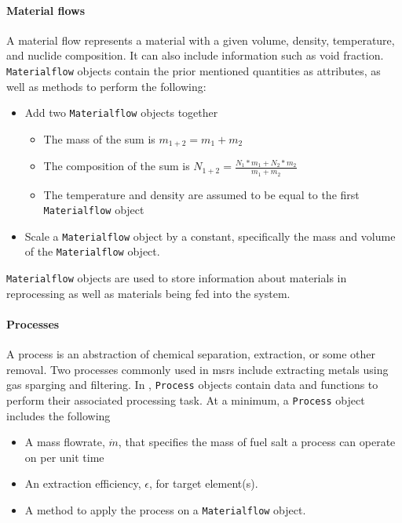 \paragraph{Material flows}
    A material flow represents a material with a given
    volume, density, temperature, and nuclide composition.
    It can also include information such as void fraction. \verb.Materialflow.
    objects contain the prior mentioned quantities as attributes, as well as
    methods to perform the following:
    \begin{itemize}
        \item Add two \verb.Materialflow. objects together
            \begin{itemize}
                \item The mass of the sum is $m_{1+2} = m_{1} + m_{2}$
                \item The composition of the sum is $N_{1+2} = \frac{N_{1} * m_{1} + N_{2} * m_{2}}{m_{1} + m_{2}}$
                \item The temperature and density are assumed to be equal to the
                    first \verb.Materialflow. object
            \end{itemize}
        \item Scale a \verb.Materialflow. object by a constant, specifically
            the mass and volume of the \verb.Materialflow. object.
    \end{itemize}
    \verb.Materialflow. objects are used to store information about materials
    in reprocessing as well as materials being fed into the system.

\paragraph{Processes}
    A process is an abstraction of chemical separation, extraction, or some
    other removal. Two processes commonly used in \Gls{msr}s include
    extracting metals using gas sparging and filtering. In \SaltProc,
    \verb.Process. objects contain data and functions to perform their
    associated processing task. At a minimum, a \verb.Process. object includes
    the following
    \begin{itemize}
        \item A mass flowrate, $\dot{m}$, that specifies the mass of fuel salt a process can operate on per unit time
        \item An extraction efficiency, $\epsilon$, for target element(s).
        \item A method to apply the process on a \verb.Materialflow. object. 
    \end{itemize}

